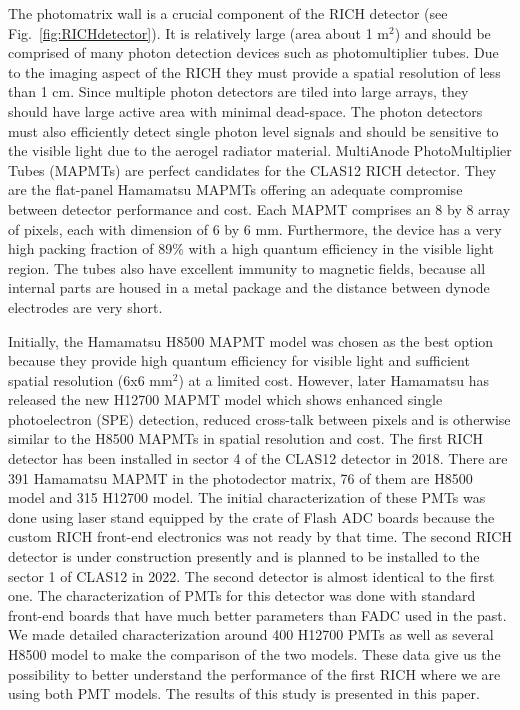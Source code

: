 The photomatrix  wall is a crucial component of the RICH detector (see Fig.~\ref{fig:RICHdetector}). It is relatively large (area about 1 m$^2$) and should be comprised of many photon detection devices such as photomultiplier tubes.
Due to the imaging aspect of the RICH they must provide a spatial resolution of less than 1 cm.
Since multiple photon detectors are tiled into large arrays, they should have large active area with minimal dead-space.
The photon detectors must also efficiently detect single photon level signals and should be sensitive to the visible light due to the aerogel radiator material.
MultiAnode PhotoMultiplier Tubes (MAPMTs) are perfect candidates for the CLAS12 RICH detector.
They are the flat-panel Hamamatsu MAPMTs offering an adequate compromise between detector performance and cost.
Each MAPMT comprises an 8 by 8 array of pixels, each with dimension of 6 by 6 mm.
Furthermore, the device has a very high packing fraction of 89\% with a high quantum efficiency in the visible light region.
The tubes also have excellent immunity to magnetic fields, because all internal parts are housed in a metal package and the distance between dynode electrodes are very short.


Initially, the Hamamatsu H8500 MAPMT model \cite{H8500} was chosen as the best option because they provide high quantum efficiency for visible light and sufficient spatial resolution (6x6 mm$^2$) at a limited cost.  However, later Hamamatsu has released the new H12700 MAPMT model  \cite{H12700} which shows enhanced single photoelectron (SPE) detection, reduced cross-talk between pixels and is otherwise similar to the H8500 MAPMTs in spatial resolution and  cost. The first RICH detector has been installed in sector 4 of the CLAS12 detector in 2018. There are 391 Hamamatsu MAPMT  in the photodector matrix, 76 of them are H8500 model and 315 H12700 model. 
The initial characterization of these PMTs was done using laser stand equipped by the crate of Flash ADC  boards \cite{FADC250} because the custom RICH front-end electronics \cite{RICH_FE} was not ready by that time. The second RICH detector is under construction presently and is planned to be installed to the sector 1 of CLAS12 in 2022. The second detector is almost identical to the first one. The characterization of PMTs for this detector was done with standard front-end boards that have much better parameters than FADC used in the past. We made detailed characterization around 400 H12700 PMTs as well as several H8500 model to make the comparison of the two models. These data give us the possibility to better understand the performance of the first RICH where we are using both PMT models. The results of this study is presented in this paper.



